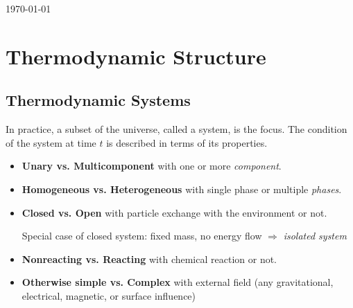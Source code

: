 \documentclass[UTF8]{book}
\begin{document}
\begin{titlepage}



{\large \today}\\[2cm] %

\vspace{5cm}



\vfill %
\end{titlepage}

\tableofcontents
\mainmatter
\chapter{Thermodynamic Structure}
\section{Thermodynamic Systems}
 In practice, a subset of the universe, called a system, is the focus.
 The condition of the system at time $t$ is
described in terms of
its properties.

\begin{itemize}
\item{ {\textbf{Unary vs. Multicomponent}}}
 { with one or more \emph{component}.}
\item{ {\textbf{Homogeneous vs. Heterogeneous}}}
 { with single phase or multiple \emph{phases}.}
\item{ {\textbf{Closed vs. Open}}}
 { with particle exchange with the environment or not.}
  
  Special case of closed system: fixed mass, no energy flow $\Rightarrow$ \emph{isolated system}
\item{ {\textbf{Nonreacting vs. Reacting}}}
 { with chemical reaction or not.}
\item{ {\textbf{Otherwise simple vs. Complex}}}
 { with external field (any gravitational, electrical, magnetic, or surface influence)}
\end{itemize}
\end{document}
